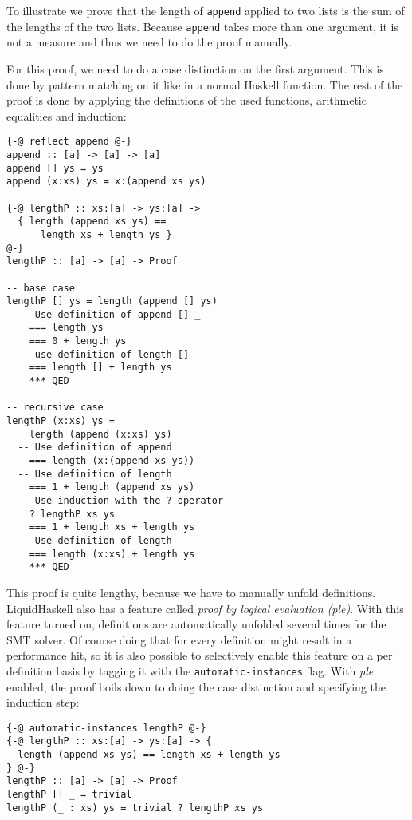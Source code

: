 \documentclass[sigplan,screen]{acmart}
\begin{document}
To illustrate we prove that the length of \texttt{append} applied to two lists is the sum of the lengths of the two lists. Because \texttt{append} takes more than one argument, it is not a measure and thus we need to do the proof manually.

For this proof, we need to do a case distinction on the first argument. This is done by pattern matching on it like in a normal Haskell function. The rest of the proof is done by applying the definitions of the used functions, arithmetic equalities and induction:

\begin{lstlisting}
{-@ reflect append @-}
append :: [a] -> [a] -> [a]
append [] ys = ys
append (x:xs) ys = x:(append xs ys)

{-@ lengthP :: xs:[a] -> ys:[a] ->
  { length (append xs ys) ==
      length xs + length ys }
@-}
lengthP :: [a] -> [a] -> Proof

-- base case
lengthP [] ys = length (append [] ys)
  -- Use definition of append [] _
    === length ys
    === 0 + length ys
  -- use definition of length []
    === length [] + length ys
    *** QED

-- recursive case
lengthP (x:xs) ys =
    length (append (x:xs) ys)
  -- Use definition of append
    === length (x:(append xs ys))
  -- Use definition of length
    === 1 + length (append xs ys)
  -- Use induction with the ? operator
    ? lengthP xs ys
    === 1 + length xs + length ys
  -- Use definition of length
    === length (x:xs) + length ys
    *** QED
\end{lstlisting}

This proof is quite lengthy, because we have to manually unfold definitions. LiquidHaskell also has a feature called \textit{proof by logical evaluation (ple)}. With this feature turned on, definitions are automatically unfolded several times for the SMT solver. Of course doing that for every definition might result in a performance hit, so it is also possible to selectively enable this feature on a per definition basis by tagging it with the \texttt{automatic-instances} flag. With \textit{ple} enabled, the proof boils down to doing the case distinction and specifying the induction step:

\begin{lstlisting}
{-@ automatic-instances lengthP @-}
{-@ lengthP :: xs:[a] -> ys:[a] -> {
  length (append xs ys) == length xs + length ys
} @-}
lengthP :: [a] -> [a] -> Proof
lengthP [] _ = trivial
lengthP (_ : xs) ys = trivial ? lengthP xs ys

\end{lstlisting}
\end{document}
